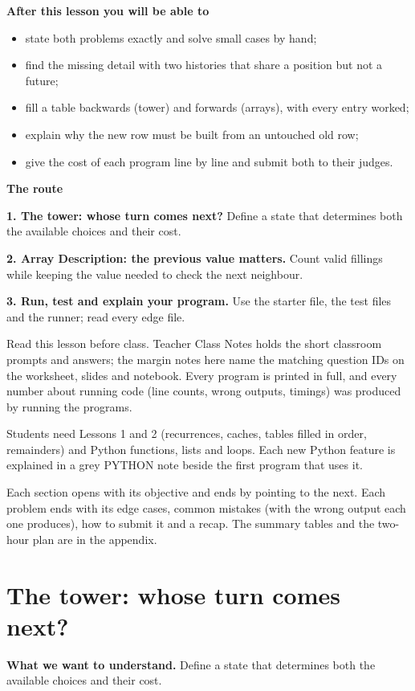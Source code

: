 \documentclass[11pt,a4paper,oneside]{report}
\newcommand{\readinggoal}[1]{\par\textbf{What we want to understand.} #1\par\smallskip}
\begin{document}
\textbf{After this lesson you will be able to}\begin{itemize}\item state both problems exactly and solve small cases by hand;\item find the missing detail with two histories that share a position but not a future;\item fill a table backwards (tower) and forwards (arrays), with every entry worked;\item explain why the new row must be built from an untouched old row;\item give the cost of each program line by line and submit both to their judges.\end{itemize}
\textbf{The route}\par
\textbf{1. The tower: whose turn comes next?} Define a state that determines both the available choices and their cost.\par
\textbf{2. Array Description: the previous value matters.} Count valid fillings while keeping the value needed to check the next neighbour.\par
\textbf{3. Run, test and explain your program.} Use the starter file, the test files and the runner; read every edge file.\par
Read this lesson before class. Teacher Class Notes holds the short classroom prompts and answers; the margin notes here name the matching question IDs on the worksheet, slides and notebook. Every program is printed in full, and every number about running code (line counts, wrong outputs, timings) was produced by running the programs.

Students need Lessons 1 and 2 (recurrences, caches, tables filled in order, remainders) and Python functions, lists and loops. Each new Python feature is explained in a grey PYTHON note beside the first program that uses it.

Each section opens with its objective and ends by pointing to the next. Each problem ends with its edge cases, common mistakes (with the wrong output each one produces), how to submit it and a recap. The summary tables and the two-hour plan are in the appendix.


\chapter{The tower: whose turn comes next?}
\readinggoal{Define a state that determines both the available choices and their cost.}
\end{document}
